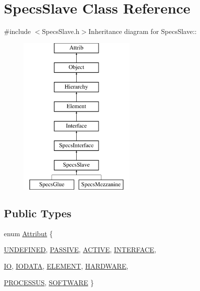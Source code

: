 \hypertarget{classSpecsSlave}{
\section{SpecsSlave Class Reference}
\label{classSpecsSlave}
}


{\ttfamily \#include $<$SpecsSlave.h$>$}Inheritance diagram for SpecsSlave::\begin{figure}[H]
\begin{center}
\leavevmode
\includegraphics[height=8cm]{classSpecsSlave}
\end{center}
\end{figure}
\subsection*{Public Types}
\begin{DoxyCompactItemize}
\item 
enum \hyperlink{classAttrib_a69e171d7cc6417835a5a306d3c764235}{Attribut} \{ \par
\hyperlink{classAttrib_a69e171d7cc6417835a5a306d3c764235a3a8da2ab97dda18aebab196fe4100531}{UNDEFINED}, 
\hyperlink{classAttrib_a69e171d7cc6417835a5a306d3c764235a2bfb2af57b87031d190a05fe25dd92ed}{PASSIVE}, 
\hyperlink{classAttrib_a69e171d7cc6417835a5a306d3c764235a3b1fec929c0370d1436f2f06e298fb0d}{ACTIVE}, 
\hyperlink{classAttrib_a69e171d7cc6417835a5a306d3c764235aa27c16b480a369ea4d18b07b2516bbc7}{INTERFACE}, 
\par
\hyperlink{classAttrib_a69e171d7cc6417835a5a306d3c764235a1420a5b8c0540b2af210b6975eded7f9}{IO}, 
\hyperlink{classAttrib_a69e171d7cc6417835a5a306d3c764235a0af3b0d0ac323c1704e6c69cf90add28}{IODATA}, 
\hyperlink{classAttrib_a69e171d7cc6417835a5a306d3c764235a7788bc5dd333fd8ce18562b269c9dab1}{ELEMENT}, 
\hyperlink{classAttrib_a69e171d7cc6417835a5a306d3c764235a61ceb22149f365f1780d18f9d1459423}{HARDWARE}, 
\par
\hyperlink{classAttrib_a69e171d7cc6417835a5a306d3c764235a75250e29692496e73effca2c0330977f}{PROCESSUS}, 
\hyperlink{classAttrib_a69e171d7cc6417835a5a306d3c764235a103a67cd0b8f07ef478fa45d4356e27b}{SOFTWARE}
 \}
\end{DoxyCompactItemize}
